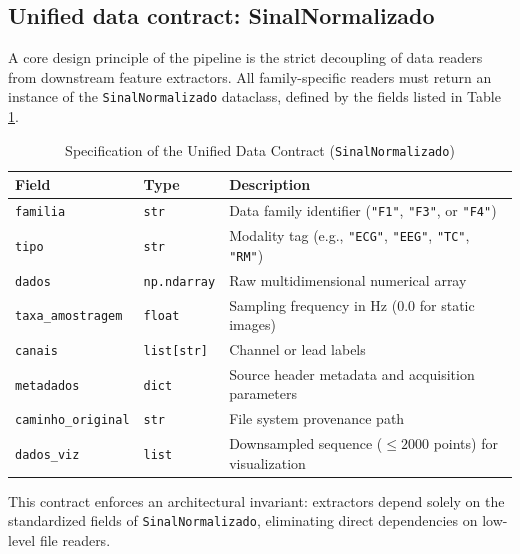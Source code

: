 \subsection{Unified data contract: SinalNormalizado}
A core design principle of the pipeline is the strict decoupling of data readers from downstream feature extractors. All family-specific readers must return an instance of the \texttt{SinalNormalizado} dataclass, defined by the fields listed in Table \ref{tab:contrato_dados}.

\begin{table}[htbp]
\caption{Specification of the Unified Data Contract (\texttt{SinalNormalizado})}
\label{tab:contrato_dados}
\centering
\begin{tabular}{@{}lll@{}}
\toprule
\textbf{Field} & \textbf{Type} & \textbf{Description} \\ \midrule
\texttt{familia} & \texttt{str} & Data family identifier (\texttt{"F1"}, \texttt{"F3"}, or \texttt{"F4"}) \\
\texttt{tipo} & \texttt{str} & Modality tag (e.g., \texttt{"ECG"}, \texttt{"EEG"}, \texttt{"TC"}, \texttt{"RM"}) \\
\texttt{dados} & \texttt{np.ndarray} & Raw multidimensional numerical array \\
\texttt{taxa\_amostragem} & \texttt{float} & Sampling frequency in Hz ($0.0$ for static images) \\
\texttt{canais} & \texttt{list[str]} & Channel or lead labels \\
\texttt{metadados} & \texttt{dict} & Source header metadata and acquisition parameters \\
\texttt{caminho\_original} & \texttt{str} & File system provenance path \\
\texttt{dados\_viz} & \texttt{list} & Downsampled sequence ($\le 2000$ points) for visualization \\ \bottomrule
\end{tabular}
\end{table}

This contract enforces an architectural invariant: extractors depend solely on the standardized fields of \texttt{SinalNormalizado}, eliminating direct dependencies on low-level file readers.

